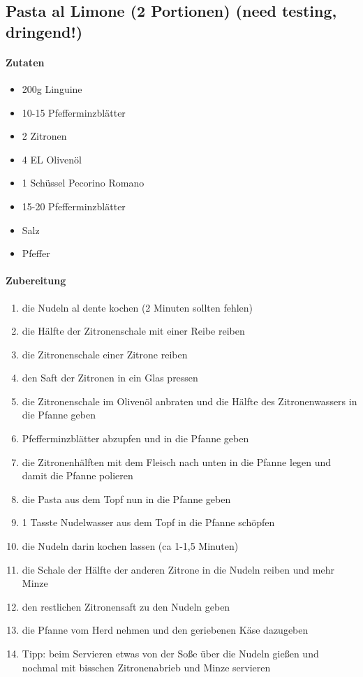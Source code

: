 \newpage
\subsection{Pasta al Limone (2 Portionen) (need testing, dringend!)}
\paragraph{Zutaten}
\begin{itemize}[noitemsep]
	\item 200g Linguine 
	\item 10-15 Pfefferminzblätter
	\item 2 Zitronen
	\item 4 EL Olivenöl 
	\item 1 Schüssel Pecorino Romano
	\item 15-20 Pfefferminzblätter 
	\item Salz
	\item Pfeffer
\end{itemize}
\paragraph{Zubereitung}
\begin{enumerate}[noitemsep]
	\item die Nudeln al dente kochen (2 Minuten sollten fehlen)
	\item die Hälfte der Zitronenschale mit einer Reibe reiben 
	\item die Zitronenschale einer Zitrone reiben 
	\item den Saft der Zitronen in ein Glas pressen
	\item die Zitronenschale im Olivenöl anbraten und die Hälfte des Zitronenwassers in die Pfanne geben
	\item Pfefferminzblätter abzupfen und in die Pfanne geben 
	\item die Zitronenhälften mit dem Fleisch nach unten in die Pfanne legen und damit die Pfanne \glqq{}polieren\grqq{}
	\item die Pasta aus dem Topf nun in die Pfanne geben 
	\item 1 Tasste Nudelwasser aus dem Topf in die Pfanne schöpfen 
	\item die Nudeln darin kochen lassen (ca 1-1,5 Minuten) 
	\item die Schale der Hälfte der anderen Zitrone in die Nudeln reiben und mehr Minze
	\item den restlichen Zitronensaft zu den Nudeln geben
	\item die Pfanne vom Herd nehmen und den geriebenen Käse dazugeben 
	\item Tipp: beim Servieren etwas von der Soße über die Nudeln gießen und nochmal mit bisschen Zitronenabrieb und Minze servieren
\end{enumerate}